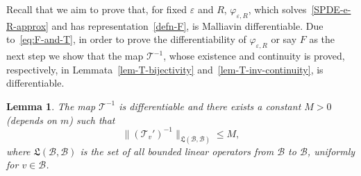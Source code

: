 \documentclass{article}
\newtheorem{lemma}{Lemma}
\begin{document}
Recall that we aim to prove that, for fixed $\varepsilon$ and $R$,
$\varphi_{\varepsilon, R}$, which solves~\eqref{SPDE-e-R-approx} and has
representation~\eqref{defn-F}, is Malliavin differentiable. Due
to~\eqref{eq:F-and-T}, in order to prove the differentiability of
$\varphi_{\varepsilon, R}$ or say $F$ as the next step we show that the map
$\mathcal{T}^{- 1}$, whose existence and continuity is proved, respectively,
in Lemmata~\ref{lem-T-bijectivity} and~\ref{lem-T-inv-continuity}, is differentiable.
%
\begin{lemma}
  \label{lemma-T-differentiability}The map $\mathcal{T}^{- 1}$ is
  differentiable and there exists a constant $M > 0$ (depends on $m$) such
  that
  \begin{equation}
      \| (\mathcal{T}_v')^{- 1} \|_{\mathfrak{L} (\mathcal{B}, \mathcal{B})}
      \leqslant M,
        \label{bound-derv-T-inverse}
  \end{equation}
  where $\mathfrak{L} (\mathcal{B}, \mathcal{B})$ is the set of all bounded linear operators from $\mathcal{B}$ to $\mathcal{B}$, uniformly for $v \in \mathcal{B}$.
\end{lemma}
%
\end{document}
